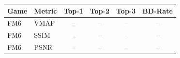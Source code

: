 \begin{tabular}{llcccc}
\toprule
Game & Metric & Top-1 & Top-2 & Top-3 & BD-Rate \\
\midrule
FM6 & VMAF & -- & -- & -- & -- \\
FM6 & SSIM & -- & -- & -- & -- \\
FM6 & PSNR & -- & -- & -- & -- \\
\bottomrule
\end{tabular}
